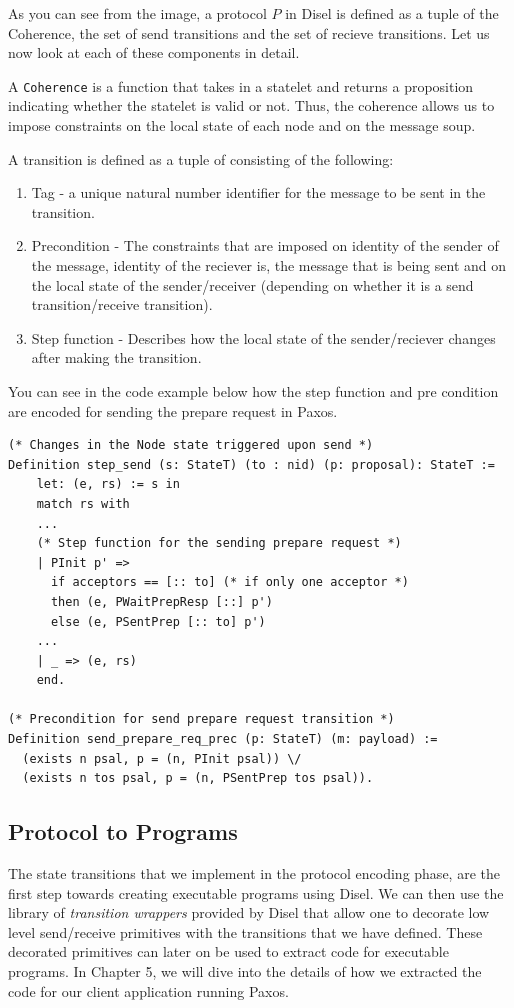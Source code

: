 As you can see from the image, a protocol $P$ in Disel is defined as a tuple
of the Coherence, the set of send transitions and the set of recieve transitions.
Let us now look at each of these components in detail.

A \texttt{Coherence} is a function that takes in a statelet and returns a proposition
indicating whether the statelet is valid or not. Thus, the coherence allows us
to impose constraints on the local state of each node and on the message soup.

A transition is defined as a tuple of consisting of the following:
\begin{enumerate}
  \item Tag - a unique natural number identifier for the message to be sent in the transition.
  \item Precondition - The constraints that are imposed on identity of the sender of the message,
    identity of the reciever is, the message that is being sent and on the local state of
    the sender/receiver (depending on whether it is a send transition/receive transition).
  \item Step function - Describes how the local state of the sender/reciever changes after
    making the transition.
\end{enumerate}

You can see in the code example below how the step function and pre condition
are encoded for sending the prepare request in Paxos.

\begin{lstlisting}
(* Changes in the Node state triggered upon send *)
Definition step_send (s: StateT) (to : nid) (p: proposal): StateT :=
    let: (e, rs) := s in
    match rs with
    ...
    (* Step function for the sending prepare request *)
    | PInit p' =>
      if acceptors == [:: to] (* if only one acceptor *)
      then (e, PWaitPrepResp [::] p')
      else (e, PSentPrep [:: to] p')
    ...
    | _ => (e, rs)
    end.

(* Precondition for send prepare request transition *)
Definition send_prepare_req_prec (p: StateT) (m: payload) :=
  (exists n psal, p = (n, PInit psal)) \/
  (exists n tos psal, p = (n, PSentPrep tos psal)).
\end{lstlisting}

\subsection{Protocol to Programs}
The state transitions that we implement in the protocol encoding phase, are the
first step towards creating executable programs using Disel.
We can then use the library of \textit{transition wrappers} provided by Disel
that allow one to decorate low level send/receive primitives with the transitions
that we have defined. These decorated primitives can later on be used to extract
code for executable programs. In Chapter 5, we will dive into the details of
how we extracted the code for our client application running Paxos.


